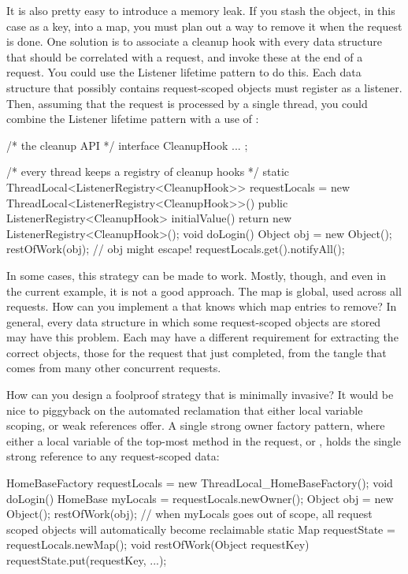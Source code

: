 It is also pretty easy to introduce a memory leak. If you
stash the object, in this case as a key, into a map, you must plan out a way to
remove it when the  request is done. One solution is to associate a
cleanup hook with every data structure that should be correlated with a request,
and invoke these at the end of a request. You could use the Listener lifetime
pattern to do this. Each data structure that possibly contains request-scoped
objects must register as a listener. Then, assuming that the request is processed
by a single thread, you could combine the Listener lifetime pattern with a use of
\tls:
\begin{shortlisting}
/* the cleanup API */
interface CleanupHook { ... };

/* every thread keeps a registry of cleanup hooks */
static ThreadLocal<ListenerRegistry<CleanupHook>> requestLocals = new ThreadLocal<ListenerRegistry<CleanupHook>>() {
   public ListenerRegistry<CleanupHook> initialValue() {
      return new ListenerRegistry<CleanupHook>();
   }
}
void doLogin() {
   Object obj = new Object();
   restOfWork(obj); // obj might escape!
   requestLocals.get().notifyAll();
}
\end{shortlisting}

In some cases, this strategy can be made to work. Mostly, though, and even in the
current example, it is not a good approach. The  map is
global, used across all requests. How can you implement a  that
knows which map entries to remove? In general, every data structure in which some
request-scoped objects are stored may have this problem. Each may have a
different requirement for extracting the correct objects, those for the request
that just completed, from the tangle that comes from many other concurrent
requests.


How can you design a foolproof strategy that is minimally invasive? It would be
nice to piggyback on the automated reclamation that either local variable
scoping, or weak references offer. A single strong owner factory pattern, where
either a local variable of the top-most method in the request, or \tls, holds the
single strong reference to any request-scoped data:
\begin{shortlisting}
HomeBaseFactory requestLocals = new ThreadLocal_HomeBaseFactory();
void doLogin() {
   HomeBase myLocals = requestLocals.newOwner();
   Object obj = new Object();
   restOfWork(obj);
   // when myLocals goes out of scope, all request scoped objects will automatically become reclaimable
}
static Map requestState = requestLocals.newMap();
void restOfWork(Object requestKey) {
   requestState.put(requestKey, ...);
}
\end{shortlisting}

